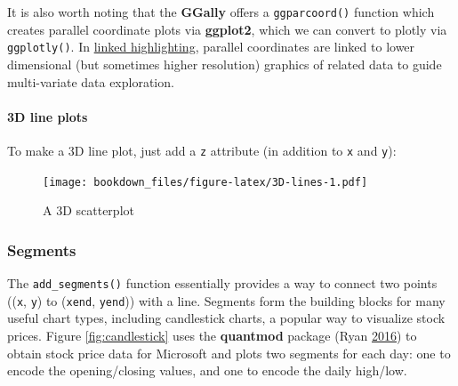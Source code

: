 \documentclass[12pt,]{isuthesis}
\newenvironment{Shaded}{\begin{snugshade}}{\end{snugshade}}
\newcommand{\KeywordTok}[1]{\textcolor[rgb]{0.13,0.29,0.53}{\textbf{{#1}}}}
\newcommand{\DataTypeTok}[1]{\textcolor[rgb]{0.13,0.29,0.53}{{#1}}}
\newcommand{\StringTok}[1]{\textcolor[rgb]{0.31,0.60,0.02}{{#1}}}
\newcommand{\NormalTok}[1]{{#1}}
\let\oldparagraph\paragraph
\renewcommand{\paragraph}[1]{\oldparagraph{#1}\mbox{}}
\begin{document}
It is also worth noting that the \textbf{GGally} offers a
\texttt{ggparcoord()} function which creates parallel coordinate plots
via \textbf{ggplot2}, which we can convert to plotly via
\texttt{ggplotly()}. In \protect\hyperlink{linked-highlighting}{linked
highlighting}, parallel coordinates are linked to lower dimensional (but
sometimes higher resolution) graphics of related data to guide
multi-variate data exploration.

\paragraph{3D line plots}\label{d-line-plots}

To make a 3D line plot, just add a \texttt{z} attribute (in addition to
\texttt{x} and \texttt{y}):

\begin{Shaded}
\end{Shaded}

\begin{figure}[htbp]
\centering
\texttt{[image: bookdown\_files/figure-latex/3D-lines-1.pdf]}
\caption{\label{fig:3D-lines}A 3D scatterplot}
\end{figure}

\subsubsection{Segments}\label{segments}

The \texttt{add\_segments()} function essentially provides a way to
connect two points ((\texttt{x}, \texttt{y}) to (\texttt{xend},
\texttt{yend})) with a line. Segments form the building blocks for many
useful chart types, including candlestick charts, a popular way to
visualize stock prices. Figure \ref{fig:candlestick} uses the
\textbf{quantmod} package (Ryan \protect\hyperlink{ref-quantmod}{2016})
to obtain stock price data for Microsoft and plots two segments for each
day: one to encode the opening/closing values, and one to encode the
daily high/low.
\end{document}
